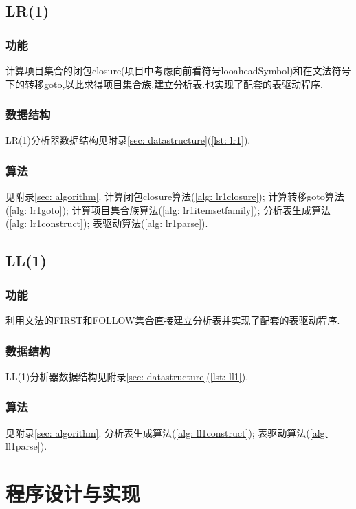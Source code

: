 \documentclass[11pt]{article}
\begin{document}
\subsection{LR(1)}
\subsubsection{功能}
计算项目集合的闭包closure(项目中考虑向前看符号looaheadSymbol)和在文法符号下的转移goto,以此求得项目集合族,建立分析表.也实现了配套的表驱动程序.

\subsubsection{数据结构}
LR(1)分析器数据结构见附录\ref{sec: datastructure}(\ref{lst: lr1}).

\subsubsection{算法}
见附录\ref{sec: algorithm}.
计算闭包closure算法(\ref{alg: lr1closure});
计算转移goto算法(\ref{alg: lr1goto});
计算项目集合族算法(\ref{alg: lr1itemsetfamily});
分析表生成算法(\ref{alg: lr1construct});
表驱动算法(\ref{alg: lr1parse}).

\subsection{LL(1)}
\subsubsection{功能}
利用文法的FIRST和FOLLOW集合直接建立分析表并实现了配套的表驱动程序.

\subsubsection{数据结构}
LL(1)分析器数据结构见附录\ref{sec: datastructure}(\ref{lst: ll1}).

\subsubsection{算法}
见附录\ref{sec: algorithm}.
分析表生成算法(\ref{alg: ll1construct});
表驱动算法(\ref{alg: ll1parse}).

\section{程序设计与实现}
\end{document}
